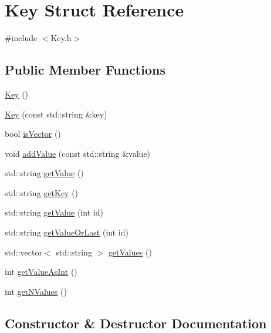 \hypertarget{struct_key}{}\section{Key Struct Reference}
\label{struct_key}


{\ttfamily \#include $<$Key.\+h$>$}

\subsection*{Public Member Functions}
\begin{DoxyCompactItemize}
\item 
\hyperlink{struct_key_a22e51dbebb18c1d33ee8bba93a1b3b4d}{Key} ()
\item 
\hyperlink{struct_key_abc4ba925a8a8d807ae9671a058e4fd9d}{Key} (const std\+::string \&key)
\item 
bool \hyperlink{struct_key_a23777b784264c6498efaa593bc29f48a}{is\+Vector} ()
\item 
void \hyperlink{struct_key_a8818b63b35d22713f32dc52a17c9b9a4}{add\+Value} (const std\+::string \&value)
\item 
std\+::string \hyperlink{struct_key_aefe1fbf42b37b3559561945a78c7511c}{get\+Value} ()
\item 
std\+::string \hyperlink{struct_key_a7a1b140dc635e6227516e8abdecba16c}{get\+Key} ()
\item 
std\+::string \hyperlink{struct_key_a2be25595a7cc739ff609b439fc206fde}{get\+Value} (int id)
\item 
std\+::string \hyperlink{struct_key_a74d0f7686b859dabde58e729cf9f7b41}{get\+Value\+Or\+Last} (int id)
\item 
std\+::vector$<$ std\+::string $>$ \hyperlink{struct_key_ac97e2bba994c9571e32083e1fb91c4f5}{get\+Values} ()
\item 
int \hyperlink{struct_key_a0633f6b820d00b10167344ca8796c26d}{get\+Value\+As\+Int} ()
\item 
int \hyperlink{struct_key_a2164f5d7ff7dc435477fdab178f5557a}{get\+N\+Values} ()
\end{DoxyCompactItemize}


\subsection{Constructor \& Destructor Documentation}
\mbox{\label{struct_key_a22e51dbebb18c1d33ee8bba93a1b3b4d}} 
